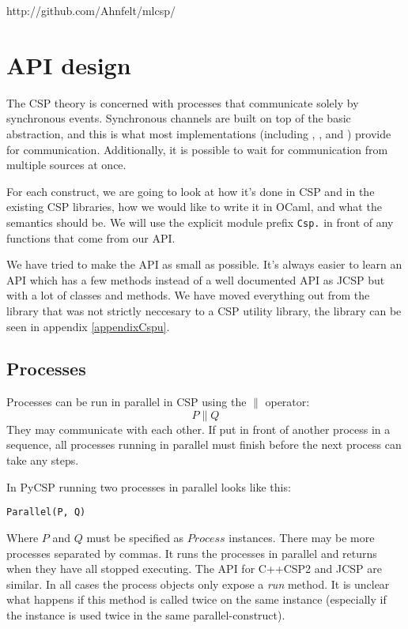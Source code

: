 \documentclass[a4paper,12pt]{article}
\begin{document}
\begin{center}
http://github.com/Ahnfelt/mlcsp/
\end{center}

\section{API design}
\label{apidesign}

The CSP theory is concerned with processes that communicate solely by synchronous 
events. Synchronous channels are built on top of the basic abstraction, and this is
what most implementations (including \cite{occam}, \cite{cppcsp2}, \cite{jcsp} and 
\cite{pycsp}) provide for communication. 
Additionally, it is possible to wait for communication from multiple sources at once.

For each construct, we are going to look at how it's done in CSP and in the 
existing CSP libraries, how we would like to write it in OCaml, and what the 
semantics should be. We will use the explicit module prefix \verb|Csp.| in front
of any functions that come from our API.

We have tried to make the API as small as possible. It's always easier to
learn an API which has a few methods instead of a well documented API as JCSP
but with a lot of classes and methods. We have moved everything out from the
library that was not strictly neccesary to a CSP utility library, the library
can be seen in appendix \ref{appendixCspu}.

\subsection{Processes}
Processes can be run in parallel in CSP using the $\parallel$ operator:
\[P \parallel Q\]
They may communicate with each other. If put in front of another process in a
sequence, all processes running in parallel must finish before the next process
can take any steps.

In PyCSP running two processes in parallel looks like this:
\begin{verbatim}
Parallel(P, Q)
\end{verbatim}
Where $P$ and $Q$ must be specified as $Process$ instances. There may be more processes
separated by commas. It runs the processes in parallel and returns when they have all 
stopped executing. The API for C++CSP2 and JCSP are similar. In all cases the
process objects only expose a \emph{run} method. It is unclear what happens if
this method is called twice on the same instance (especially if the instance is
used twice in the same parallel-construct).
\end{document}
